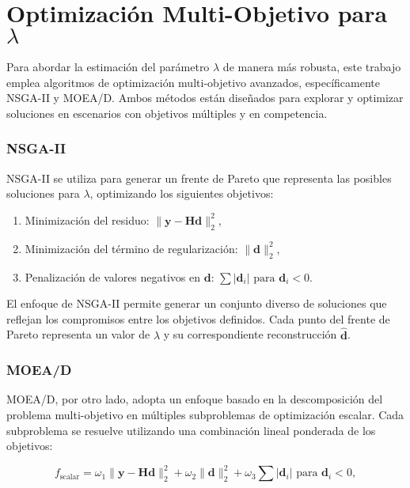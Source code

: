 \section{Optimización Multi-Objetivo para \( \lambda \)} \label{sec:method:multiobj}

Para abordar la estimación del parámetro \( \lambda \) de manera más robusta, este trabajo emplea algoritmos de optimización multi-objetivo avanzados, específicamente NSGA-II y MOEA/D. Ambos métodos están diseñados para explorar y optimizar soluciones en escenarios con objetivos múltiples y en competencia.

\subsubsection{NSGA-II} \label{sec:method:nsga}
NSGA-II se utiliza para generar un frente de Pareto que representa las posibles soluciones para \( \lambda \), optimizando los siguientes objetivos:
\begin{enumerate}
    \item Minimización del residuo: \( \| \mathbf{y} - \mathbf{H} \mathbf{d} \|_2^2 \),
    \item Minimización del término de regularización: \( \| \mathbf{d} \|_2^2 \),
    \item Penalización de valores negativos en \( \mathbf{d} \): \( \sum |\mathbf{d}_i| \text{ para } \mathbf{d}_i < 0 \).
\end{enumerate}

El enfoque de NSGA-II permite generar un conjunto diverso de soluciones que reflejan los compromisos entre los objetivos definidos. Cada punto del frente de Pareto representa un valor de \( \lambda \) y su correspondiente reconstrucción \( \hat{\mathbf{d}} \).

\subsubsection{MOEA/D} \label{sec:method:moead}
MOEA/D, por otro lado, adopta un enfoque basado en la descomposición del problema multi-objetivo en múltiples subproblemas de optimización escalar. Cada subproblema se resuelve utilizando una combinación lineal ponderada de los objetivos:

\begin{equation}
    f_{\text{scalar}} = \omega_1 \| \mathbf{y} - \mathbf{H} \mathbf{d} \|_2^2 + \omega_2 \| \mathbf{d} \|_2^2 + \omega_3 \sum |\mathbf{d}_i| \text{ para } \mathbf{d}_i < 0,
\end{equation}

